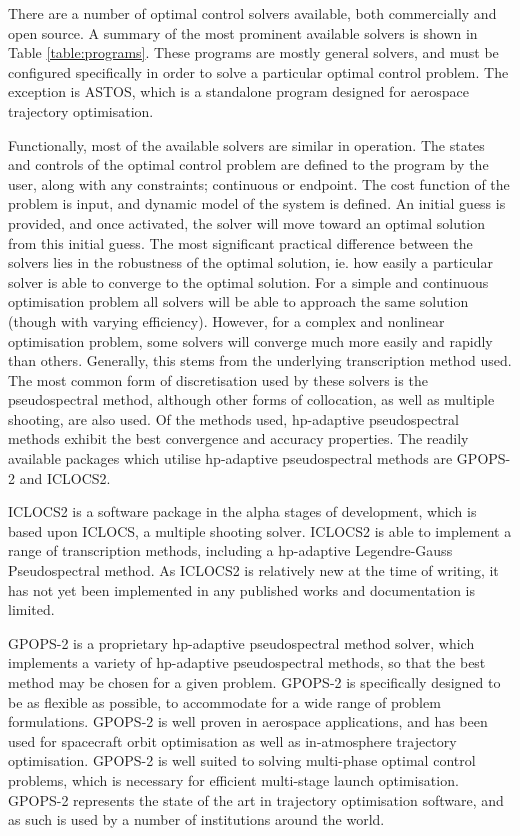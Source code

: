 There are a number of optimal control solvers available, both commercially and open source. A summary of the most prominent available solvers is shown in Table \ref{table:programs}. These programs are mostly general solvers, and must be configured specifically in order to solve a particular optimal control problem. The exception is ASTOS\cite{astos}, which is a standalone program designed for aerospace trajectory optimisation.

Functionally, most of the available solvers are similar in operation. The states and controls of the optimal control problem are defined to the program by the user, along with any constraints; continuous or endpoint. The cost function of the problem is input, and dynamic model of the system is defined. An initial guess is provided, and once activated, the solver will move toward an optimal solution from this initial guess. 
The most significant practical difference between the solvers lies in the robustness of the optimal solution, ie. how easily a particular solver is able to converge to the optimal solution. For a simple and continuous optimisation problem all solvers will be able to approach the same solution (though with varying efficiency). However, for a complex and nonlinear optimisation problem, some solvers will converge much more easily and rapidly than others. Generally, this stems from the underlying transcription method used. 
 The most common form of discretisation used by these solvers is the pseudospectral method, although other forms of collocation, as well as multiple shooting, are also used. Of the methods used, \textsf{hp}-adaptive pseudospectral methods exhibit the best convergence and accuracy properties\cite{Chai2015}. The readily available packages which utilise \textsf{hp}-adaptive pseudospectral methods are GPOPS-2\cite{Rao2010} and ICLOCS2\cite{iclocs}.
 
 ICLOCS2 is a software package in the alpha stages of development, which is based upon ICLOCS, a multiple shooting solver\cite{iclocs}. ICLOCS2 is able to implement a range of transcription methods, including a \textsf{hp}-adaptive Legendre-Gauss Pseudospectral method\cite{iclocs}. As ICLOCS2 is relatively new at the time of writing, it has not yet been implemented in any published works and documentation is limited. 
 
GPOPS-2 is a proprietary \textsf{hp}-adaptive pseudospectral method solver, which implements a variety of \textsf{hp}-adaptive pseudospectral methods, so that the best method may be chosen for a given problem\cite{Rao2010}. GPOPS-2 is specifically designed to be as flexible as possible, to accommodate for a wide range of problem formulations\cite{Rao2010}. GPOPS-2 is well proven in aerospace applications, and has been used for spacecraft orbit optimisation as well as in-atmosphere trajectory optimisation\cite{Rizvi2015,Lipp2014}. GPOPS-2 is well suited to solving multi-phase optimal control problems, which is necessary for efficient multi-stage launch optimisation\cite{Rao2010}. GPOPS-2 represents the state of the art in trajectory optimisation software, and as such is used by a number of institutions around the world. 

